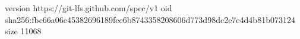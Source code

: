 version https://git-lfs.github.com/spec/v1
oid sha256:fbc66a06e45382696189fee6b8743358208606d773d98dc2e7e4d4b81b073124
size 11068
